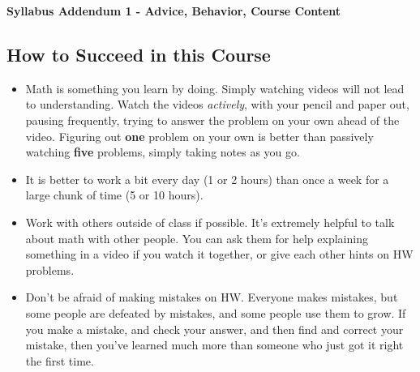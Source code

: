 \documentclass[12pt, twoside]{article}
\begin{document}
\newpage
\begin{center}
   \large{\textbf{Syllabus Addendum 1 - Advice, Behavior, Course Content}}
\end{center}

\subsection*{How to Succeed in this Course}
\begin{itemize}
   \item Math is something you learn by doing. Simply watching videos will not lead to understanding. Watch the videos \emph{actively}, with your pencil and paper out, pausing frequently, trying to answer the problem on your own ahead of the video. Figuring out \textbf{one} problem on your own is better than passively watching \textbf{five} problems, simply taking notes as you go.
   
   \item It is better to work a bit every day (1 or 2 hours) than once a week for a large chunk of time (5 or 10 hours).
   
   \item Work with others outside of class if possible. It's extremely helpful to talk about math with other people. You can ask them for help explaining something in a video if you watch it together, or give each other hints on HW problems.
   
   \item Don't be afraid of making mistakes on HW. Everyone makes mistakes, but some people are defeated by mistakes, and some people use them to grow. If you make a mistake, and check your answer, and then find and correct your mistake, then you've learned much more than someone who just got it right the first time.
   

\end{itemize}
\end{document}
